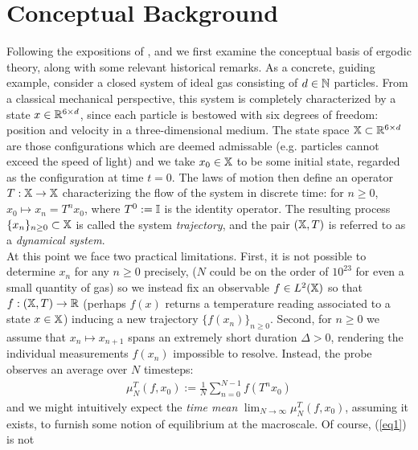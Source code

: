 \documentclass[11pt]{report}
\theoremstyle{definition}
\begin{document}
    \section{Conceptual Background}\label{sec1}
    Following the expositions of \cite[ch.1]{Eisner_Farkas_Haase_Nagel_2015},
    and \cite[ch.2, $\S$5]{Reed_Simon_1972} we first examine the conceptual
    basis of ergodic theory, along with some relevant historical remarks. As a
    concrete, guiding example, consider a closed system of ideal gas consisting
    of $d\in\mathbb{N}$ particles. From a classical mechanical perspective, this
    system is completely characterized by a state $x\in\mathbb{R}^{6\times d}$,
    since each particle is bestowed with six degrees of freedom: position and
    velocity in a three-dimensional medium. The state space
    $\mathbb{X}\subset\mathbb{R}^{6\times d}$ are those configurations which are
    deemed admissable (e.g. particles cannot exceed the speed of light) and we
    take $x_0\in\mathbb{X}$ to be some initial state, regarded as the configuration
    at time $t=0$. The laws of motion then define an operator
    $T:\mathbb{X}\rightarrow\mathbb{X}$ characterizing the flow of the system in
    discrete time: for $n\geq 0$, $x_0\mapsto x_n=T^nx_0$, where $T^0:=\mathbb{I}$
    is the identity operator. The resulting process
    $\{x_n\}_{n\geq0}\subset\mathbb{X}$ is called the system \textit{trajectory},
    and the pair $(\mathbb{X},T)$ is referred to as a \textit{dynamical
    system}.\\[5pt]
    \indent At this point we face two practical limitations. First, it is not
    possible to determine $x_n$ for any $n\geq 0$ precisely, ($N$ could be on
    the order of $10^{23}$ for even a small quantity of gas) so we instead fix
    an observable $f\in L^2(\mathbb{X})$ so that $f:(\mathbb{X},T)\rightarrow\mathbb{R}$
    (perhaps $f(x)$ returns a temperature reading associated to a state
    $x\in\mathbb{X}$) inducing a new trajectory $\{f(x_n)\}_{n\geq 0}$. Second, for
    $n\geq 0$ we assume that $x_n\mapsto x_{n+1}$ spans an extremely short
    duration $\Delta>0$, rendering the individual measurements $f(x_n)$
    impossible to resolve. Instead, the probe observes an average over $N$
    timesteps:
    \begin{align}
        \mu_N^T(f,x_0):=\frac{1}{N}\sum_{n=0}^{N-1}f(T^nx_0)\label{eq1}
    \end{align}
    and we might intuitively expect the \textit{time mean}
    $\lim_{N\rightarrow\infty}\mu^T_N(f,x_0)$, assuming it exists, to furnish
    some notion of equilibrium at the macroscale. Of course, (\ref{eq1}) is not
\end{document}
